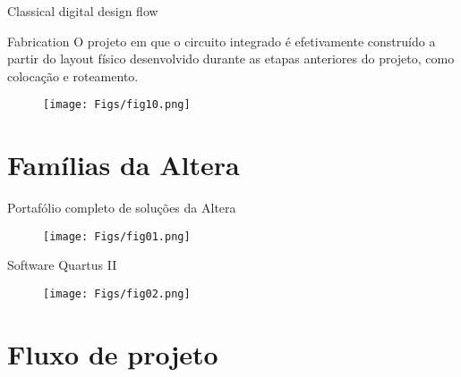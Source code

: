 \documentclass[aspectratio=169]{beamer}
\begin{document}
\begin{frame}{Classical digital design flow}
	
	\begin{block}{Fabrication}
		\justifying
		O projeto em que o circuito integrado é efetivamente construído a partir do layout físico desenvolvido durante as etapas anteriores do projeto, como colocação e roteamento.
	\end{block}	
	
	\begin{figure}[h]
		\centering
		\texttt{[image: Figs/fig10.png]}
	\end{figure}
	
\end{frame}

\section{Famílias da Altera}

\begin{frame}{Portafólio completo de soluções da Altera}
	
	\begin{figure}[h]
	\centering
	\texttt{[image: Figs/fig01.png]}
	\end{figure}
	
\end{frame}

\begin{frame}{Software Quartus II}
	
	\begin{figure}[h]
		\centering
		\texttt{[image: Figs/fig02.png]}
	\end{figure}
	
\end{frame}

\section{Fluxo de projeto}
\end{document}
